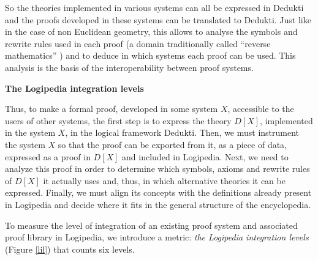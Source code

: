 So the theories implemented in various systems can all be expressed in
Dedukti and the proofs developed in these systems can be translated to
Dedukti. Just like in the case of non Euclidean geometry, this allows
to analyse the symbols and rewrite rules used in each proof
\cite{Thire18,Dowek17} (a domain traditionally called ``reverse
mathematics'' \cite{Friedman76,Simpson09}) and to deduce in which
systems each proof can be used.  This analysis is the basis of the
interoperability between proof systems.


\bigskip

\noindent
{\bf The Logipedia integration levels}

Thus, to make a formal proof, developed in some system $X$, accessible to
the users of other systems, the first step is to express the theory
$D[X]$, implemented in the system $X$, in the logical framework {\sf
  Dedukti}.  Then, we must instrument the system $X$ so that the proof
can be exported from it, as a piece of data, expressed as a proof in
$D[X]$ and included in {\sf Logipedia}. Next, we need to analyze this
proof in order to determine which symbols, axioms and rewrite rules of
$D[X]$ it actually uses and, thus, in which alternative theories it
can be expressed.  Finally, we must align its concepts with the
definitions already present in {\sf Logipedia} and decide where it
fits in the general structure of the encyclopedia.

To measure the level of integration of an existing proof system and
associated proof library in Logipedia, we introduce a metric:
{\em the Logipedia integration levels} (Figure \ref{lil}) that
counts six levels.  

